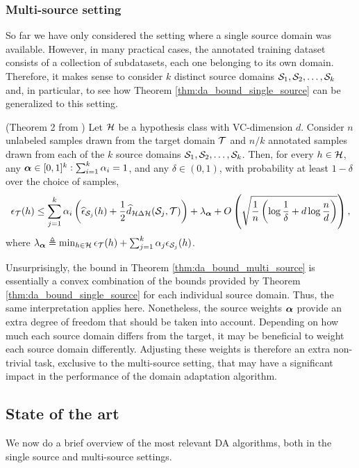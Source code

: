 \subsubsection{Multi-source setting}
\label{sec:da_theory_ms}
So far we have only considered the setting where a single source domain was available. However, in many practical cases, the annotated training dataset consists of a collection of subdatasets, each one belonging to its own domain. Therefore, it makes sense to consider $k$ distinct source domains ${\mathcal{S}}_1, {\mathcal{S}}_2, \dots, {\mathcal{S}}_k$ and, in particular, to see how Theorem \ref{thm:da_bound_single_source} can be generalized to this setting.
\begin{theorem}
	\label{thm:da_bound_multi_source}
	(Theorem 2 from \citet{Zhao2018}) Let ${\mathcal{H}}$ be a hypothesis class with VC-dimension $d$. Consider $n$ unlabeled samples drawn from the target domain ${\mathcal{T}}$ and $n/k$ annotated samples drawn from each of the $k$ source domains ${\mathcal{S}}_1, {\mathcal{S}}_2, \dots, {\mathcal{S}}_k$. Then, for every $h \in {\mathcal{H}}$, any ${\bm{\alpha}} \in [0,1]^k: \sum_{i=1}^k {\alpha}_i = 1$, and any $\delta \in (0,1)$, with probability at least $1-\delta$ over the choice of samples,
	\begin{equation}
		\label{eq:da_bound_multi_source}
		\epsilon_{\mathcal{T}}(h) \leq \sum_{j=1}^k {\alpha}_i \left(\widehat{\epsilon}_{{\mathcal{S}}_j}(h) + \frac{1}{2} \widehat{d}_{{\mathcal{H}} \Delta {\mathcal{H}}}({\mathcal{S}}_j, {\mathcal{T}})\right) + \lambda_{\bm{\alpha}} + O \left(\sqrt{\frac{1}{n} \left(\log \frac{1}{\delta} +d \log \frac{n}{d} \right)} \right),
	\end{equation}
	where $\lambda_{\bm{\alpha}} \triangleq \min_{h \in {\mathcal{H}}} \epsilon_{\mathcal{T}}(h) + \sum_{j=1}^k {\alpha}_j \epsilon_{{\mathcal{S}}_j}(h)$.
\end{theorem}
Unsurprisingly, the bound in Theorem \ref{thm:da_bound_multi_source} is essentially a convex combination of the bounds provided by Theorem \ref{thm:da_bound_single_source} for each individual source domain. Thus, the same interpretation applies here. Nonetheless, the source weights ${\bm{\alpha}}$ provide an extra degree of freedom that should be taken into account. Depending on how much each source domain differs from the target, it may be beneficial to weight each source domain differently. Adjusting these weights is therefore an extra non-trivial task, exclusive to the multi-source setting, that may have a significant impact in the performance of the domain adaptation algorithm.

\subsection{State of the art}
\label{sec:da_sota}
We now do a brief overview of the most relevant DA algorithms, both in the single source and multi-source settings. 

